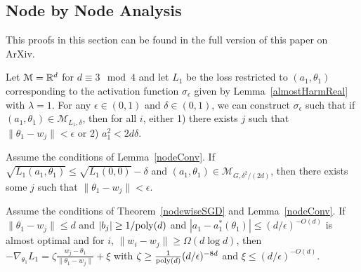 \subsection{Node by Node Analysis}

This proofs in this section can be found in the full version of this paper on ArXiv. 

\begin{lemma}\label{nodeConv}
Let $\mathcal{M} = {\mathbb{R}}^d$ for $d \equiv 3 \mod 4$ and let $L_1$ be the loss restricted to $(a_1,\theta_1)$ corresponding to the activation function $\sigma_\epsilon$ given by Lemma~\ref{almostHarmReal} with $\lambda = 1$. For any $\epsilon \in (0,1)$ and $\delta \in (0, 1)$, we can construct $\sigma_\epsilon$ such that if ${(a_1,\theta_1)} \in \mathcal{M}_{L_1,\delta}$, then for all $i$, either 1) there exists $j$ such that $\|\theta_1 - w_j\| < \epsilon$ or 2) $a_1^2 < 2d\delta$.
\end{lemma}
%
\begin{lemma}\label{nodeRes}
Assume the conditions of Lemma~\ref{nodeConv}. If
$\sqrt{L_1(a_1,\theta_1)} \leq \sqrt{L_1(0, 0)} - \delta$
  and $(a_1,\theta_1) \in \mathcal{M}_{G,\delta^2/(2d)}$,
  then there exists some $j$ such that $\|\theta_1 - w_j\| <\epsilon$.
\end{lemma}
% 
\begin{lemma}\label{nodeGradient}
Assume the conditions of Theorem~\ref{nodewiseSGD} and Lemma~\ref{nodeConv}. If $\|\theta_1 - w_j\| \leq d$ and $|b_j|\geq 1/\mathrm{poly}(d)$ and $|a_1 - a_1^*(\theta_1)| \leq (d/\epsilon)^{-O(d)}$ is almost optimal and for $i$, $\|w_i - w_j\| \geq \Omega(d \log d)$, then $-\nabla_{\theta_1}L_1 = \zeta \frac{w_j - \theta_1}{\|\theta_1 - w_j\|} + \xi$ with $\zeta \geq  \frac{1}{\mathrm{poly}(d)}(d/\epsilon)^{-8d}$ and $\xi \leq (d/\epsilon)^{-O(d)}$. 
\end{lemma}
%

